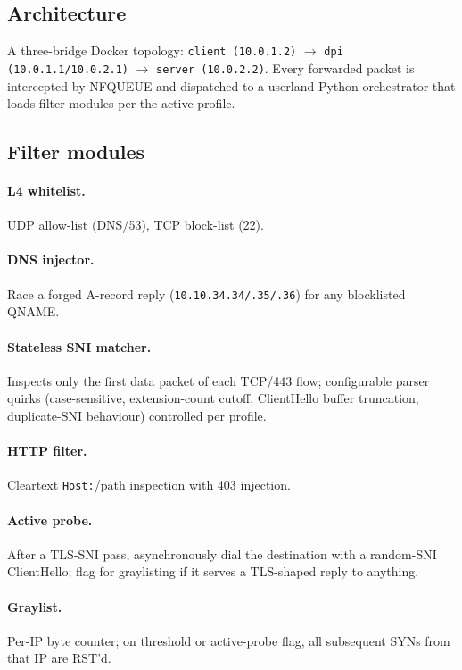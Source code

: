 \documentclass[letterpaper,twocolumn,10pt]{article}
\begin{document}

\subsection{Architecture}
A three-bridge Docker topology: \texttt{client (10.0.1.2)} $\to$
\texttt{dpi (10.0.1.1/10.0.2.1)} $\to$ \texttt{server (10.0.2.2)}. Every
forwarded packet is intercepted by NFQUEUE and dispatched to a userland
Python orchestrator that loads filter modules per the active profile.

\subsection{Filter modules}
\paragraph{L4 whitelist.} UDP allow-list (DNS/53), TCP block-list (22).
\paragraph{DNS injector.} Race a forged A-record reply
(\texttt{10.10.34.34/.35/.36}) for any blocklisted QNAME.
\paragraph{Stateless SNI matcher.} Inspects only the first data packet of
each TCP/443 flow; configurable parser quirks (case-sensitive,
extension-count cutoff, ClientHello buffer truncation, duplicate-SNI
behaviour) controlled per profile.
\paragraph{HTTP filter.} Cleartext \texttt{Host:}/path inspection with 403
injection.
\paragraph{Active probe.} After a TLS-SNI pass, asynchronously dial the
destination with a random-SNI ClientHello; flag for graylisting if it
serves a TLS-shaped reply to anything.
\paragraph{Graylist.} Per-IP byte counter; on threshold or active-probe
flag, all subsequent SYNs from that IP are RST'd.
\end{document}
